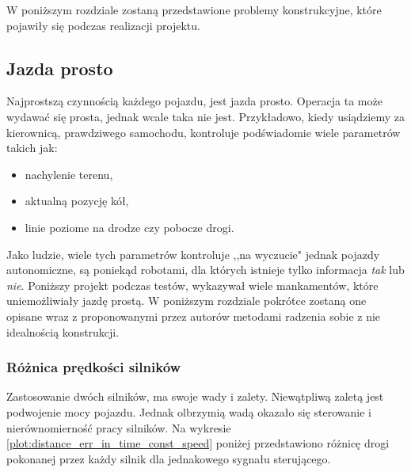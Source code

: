 \label{sec:problemy_konstrukcyjne}
    W poniższym rozdziale zostaną przedstawione problemy konstrukcyjne,
    które pojawiły się podczas realizacji projektu.

    \subsection{Jazda prosto}
    \label{section:jazda_prosto}
        Najprostszą czynnością każdego pojazdu, jest jazda prosto.
        Operacja ta może wydawać się prosta, jednak wcale taka nie jest.
        Przykładowo, kiedy usiądziemy za kierownicą, prawdziwego samochodu, kontroluje podświadomie wiele parametrów takich jak:
        \begin{itemize}
            \item nachylenie terenu,
            \item aktualną pozycję kół,
            \item linie poziome na drodze czy pobocze drogi.
        \end{itemize}
        Jako ludzie, wiele tych parametrów kontroluje ,,na wyczucie" jednak pojazdy autonomiczne, są poniekąd robotami, dla których istnieje tylko informacja \textit{tak} lub \textit{nie}.
        Poniższy projekt podczas testów, wykazywał wiele mankamentów, które uniemożliwiały jazdę prostą.
        W poniższym rozdziale pokrótce zostaną one opisane wraz z proponowanymi przez autorów metodami radzenia sobie z nie idealnością konstrukcji.
        
        \subsubsection{Różnica prędkości silników}
            Zastosowanie dwóch silników, ma swoje wady i zalety.
            Niewątpliwą zaletą jest podwojenie mocy pojazdu.
            Jednak olbrzymią wadą okazało się sterowanie i nierównomierność pracy silników.
            Na wykresie \ref{plot:distance_err_in_time_const_speed} poniżej przedstawiono różnicę drogi pokonanej przez każdy silnik dla jednakowego sygnału sterującego.

